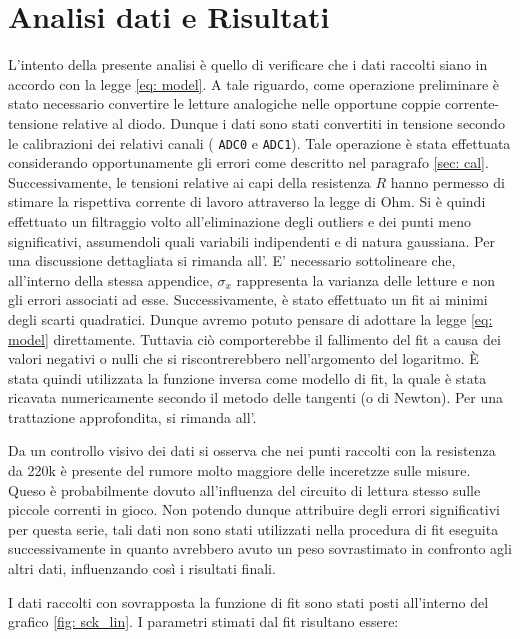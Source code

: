 \documentclass{article}[a4paper, oneside, 11pt]
\begin{document}
\section{Analisi dati e Risultati}
L’intento della presente analisi è quello di verificare che i dati raccolti 
siano in accordo con la legge \eqref{eq: model}. A tale riguardo, come 
operazione preliminare è stato necessario convertire le letture analogiche 
nelle opportune coppie corrente-tensione relative al diodo. Dunque i dati sono 
stati convertiti in tensione secondo le calibrazioni dei relativi canali (
\verb+ADC0+ e \verb+ADC1+). Tale operazione è stata effettuata considerando
opportunamente gli errori come descritto nel paragrafo \ref{sec: cal}.
Successivamente, le tensioni relative ai capi della resistenza $R$ hanno
permesso di stimare la rispettiva corrente di lavoro attraverso la legge di Ohm. 
Si è quindi effettuato un filtraggio volto all'eliminazione degli outliers e 
dei punti meno significativi, assumendoli quali variabili indipendenti e di 
natura gaussiana. Per una discussione dettagliata si rimanda all'. E’ necessario sottolineare che, all’interno della stessa appendice, 
$\sigma_x$ rappresenta la varianza delle letture e non gli errori associati ad 
esse.
Successivamente, è stato effettuato un fit ai minimi degli scarti quadratici. 
Dunque avremo potuto pensare di adottare la legge \eqref{eq: model} 
direttamente. Tuttavia ciò comporterebbe il fallimento del fit a causa dei 
valori negativi o nulli che si riscontrerebbero nell’argomento del logaritmo. 
\`E stata quindi utilizzata la funzione inversa come modello di fit, la quale 
è stata ricavata numericamente secondo il metodo delle tangenti (o di Newton). 
Per una trattazione approfondita, si rimanda all'.

Da un controllo visivo dei dati si osserva che nei punti raccolti con la resistenza da 220k è presente del rumore molto maggiore delle inceretzze sulle misure. Queso è probabilmente dovuto all'influenza del circuito di lettura stesso sulle piccole correnti in gioco. Non potendo dunque attribuire degli errori significativi per questa serie, tali dati non sono stati utilizzati nella procedura di fit eseguita successivamente in quanto avrebbero avuto un peso sovrastimato in confronto agli altri dati, influenzando così i risultati finali.
 
I dati raccolti con sovrapposta la funzione di fit sono stati posti all'interno 
del grafico \ref{fig: sck_lin}.
I parametri stimati dal fit risultano essere:
\end{document}
